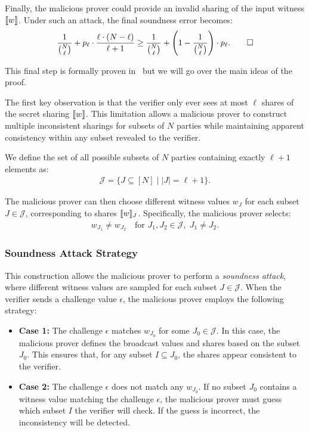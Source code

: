 \documentclass[11pt]{report}
\theoremstyle{definition}
\theoremstyle{plain}
\begin{document}
Finally, the malicious prover could provide an invalid sharing of the input witness $ \llbracket w \rrbracket $. Under such an attack, the final soundness error becomes:
\begin{align*}
  \frac{1}{\binom{N}{\ell}} + p_{\ell} \cdot \frac{\ell \cdot (N - \ell)}{\ell + 1} \geq \frac{1}{\binom{N}{\ell}} + \left(1 - \frac{1}{\binom{N}{\ell}}\right) \cdot p_{\ell}. \qed
\end{align*}

This final step is formally proven in~\cite[p20]{feneuil2023threshold} but we will go over the main ideas of the proof.

The first key observation is that the verifier only ever sees at most $\ell$ shares of the secret sharing $\llbracket w \rrbracket$. This limitation allows a malicious prover to construct multiple inconsistent sharings for subsets of $N$ parties while maintaining apparent consistency within any subset revealed to the verifier. 

We define the set of all possible subsets of $N$ parties containing exactly $\ell + 1$ elements as:
\begin{align}
  \mathcal{J} = \{J \subseteq [N] \mid |J| = \ell + 1\}.
\end{align}

The malicious prover can then choose different witness values $w_J$ for each subset $J \in \mathcal{J}$, corresponding to shares $\llbracket w \rrbracket_J$. Specifically, the malicious prover selects:
\begin{align}
  w_{J_1} \neq w_{J_2} \quad \text{for } J_1, J_2 \in \mathcal{J}, \; J_1 \neq J_2.
\end{align}

\subsubsection{Soundness Attack Strategy}
This construction allows the malicious prover to perform a \textit{soundness attack}, where different witness values are sampled for each subset $J \in \mathcal{J}$. When the verifier sends a challenge value $\epsilon$, the malicious prover employs the following strategy:
\begin{itemize}
  \item \textbf{Case 1:} The challenge $\epsilon$ matches $w_{J_0}$ for some $J_0 \in \mathcal{J}$.  
  In this case, the malicious prover defines the broadcast values and shares based on the subset $J_0$. This ensures that, for any subset $I \subseteq J_0$, the shares appear consistent to the verifier.

  \item \textbf{Case 2:} The challenge $\epsilon$ does not match any $w_{J_0}$.  
  If no subset $J_0$ contains a witness value matching the challenge $\epsilon$, the malicious prover must guess which subset $I$ the verifier will check. If the guess is incorrect, the inconsistency will be detected.
\end{itemize}
\end{document}
